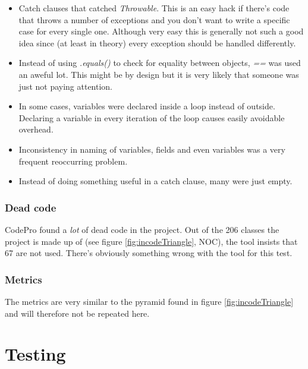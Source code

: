 \documentclass[pdftex12pt, a4paper]{article}
\begin{document}
\begin{itemize}
\item Catch clauses that catched \emph{Throwable}.
This is an easy hack if there's code that throws a number of exceptions and you don't want to write a specific case for every single one.
Although very easy this is generally not such a good idea since (at least in theory) every exception should be handled differently.
\item Instead of using \emph{.equals()} to check for equality between objects, \emph{==} was used an aweful lot.
This might be by design but it is very likely that someone was just not paying attention.
\item In some cases, variables were declared inside a loop instead of outside.
Declaring a variable in every iteration of the loop causes easily avoidable overhead.
\item Inconsistency in naming of variables, fields and even variables was a very frequent reoccurring problem.
\item Instead of doing something useful in a catch clause, many were just empty.
\end{itemize}

\subsubsection{Dead code}

CodePro found a \emph{lot} of dead code in the project.
Out of the 206 classes the project is made up of (see figure \ref{fig:incodeTriangle}, NOC), the tool insists that 67 are not used.
There's obviously something wrong with the tool for this test.

\subsubsection{Metrics}

The metrics are very similar to the pyramid found in figure \ref{fig:incodeTriangle} and will therefore not be repeated here.


\newpage

\section{Testing}
\end{document}
